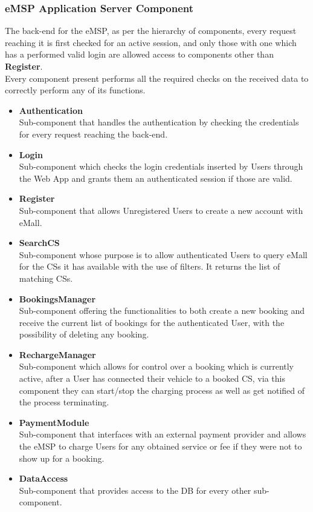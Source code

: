 \documentclass[11pt]{article}
\begin{document}
\subsubsection{eMSP Application Server Component}

The back-end for the eMSP, as per the hierarchy of components, every request reaching it is first checked for an active session, and only those with one which has a performed valid login are allowed access to components other than \textbf{Register}. \\
Every component present performs all the required checks on the received data to correctly perform any of its functions.

\begin{itemize}
    \item \textbf{Authentication} \\
        Sub-component that handles the authentication by checking the credentials for every request reaching the back-end.
    \item \textbf{Login} \\
        Sub-component which checks the login credentials inserted by Users through the Web App and grants them an authenticated session if those are valid.
    \item \textbf{Register} \\
        Sub-component that allows Unregistered Users to create a new account with eMall.
    \item \textbf{SearchCS} \\
        Sub-component whose purpose is to allow authenticated Users to query eMall for the CSs it has available with the use of filters. It returns the list of matching CSs.
    \item \textbf{BookingsManager} \\
        Sub-component offering the functionalities to both create a new booking and receive the current list of bookings for the authenticated User, with the possibility of deleting any booking. 
    \item \textbf{RechargeManager} \\
        Sub-component which allows for control over a booking which is currently active, after a User has connected their vehicle to a booked CS, via this component they can start/stop the charging process as well as get notified of the process terminating.
    \item \textbf{PaymentModule} \\
        Sub-component that interfaces with an external payment provider and allows the eMSP to charge Users for any obtained service or fee if they were not to show up for a booking.
    \item \textbf{DataAccess} \\
        Sub-component that provides access to the DB for every other sub-component.
\end{itemize}
\end{document}
